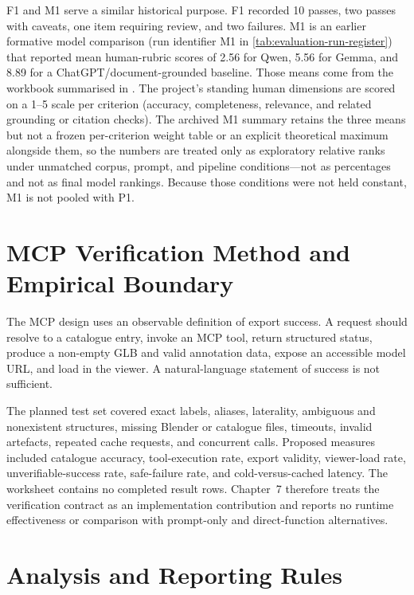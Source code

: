 F1 and M1 serve a similar historical purpose. F1 recorded 10 passes, two passes with caveats, one item requiring review, and two failures. M1 is an earlier formative model comparison (run identifier M1 in \cref{tab:evaluation-run-register}) that reported mean human-rubric scores of 2.56 for Qwen, 5.56 for Gemma, and 8.89 for a ChatGPT/document-grounded baseline. Those means come from the workbook summarised in . The project's standing human dimensions are scored on a 1--5 scale per criterion (accuracy, completeness, relevance, and related grounding or citation checks). The archived M1 summary retains the three means but not a frozen per-criterion weight table or an explicit theoretical maximum alongside them, so the numbers are treated only as exploratory relative ranks under unmatched corpus, prompt, and pipeline conditions---not as percentages and not as final model rankings. Because those conditions were not held constant, M1 is not pooled with P1.

\section{MCP Verification Method and Empirical Boundary}
\label{sec:mcp-evaluation-method}

The MCP design uses an observable definition of export success. A request should resolve to a catalogue entry, invoke an MCP tool, return structured status, produce a non-empty GLB and valid annotation data, expose an accessible model URL, and load in the viewer. A natural-language statement of success is not sufficient.

The planned test set covered exact labels, aliases, laterality, ambiguous and nonexistent structures, missing Blender or catalogue files, timeouts, invalid artefacts, repeated cache requests, and concurrent calls. Proposed measures included catalogue accuracy, tool-execution rate, export validity, viewer-load rate, unverifiable-success rate, safe-failure rate, and cold-versus-cached latency. The worksheet contains no completed result rows. Chapter~7 therefore treats the verification contract as an implementation contribution and reports no runtime effectiveness or comparison with prompt-only and direct-function alternatives.

\section{Analysis and Reporting Rules}
\label{sec:analysis-rules}

